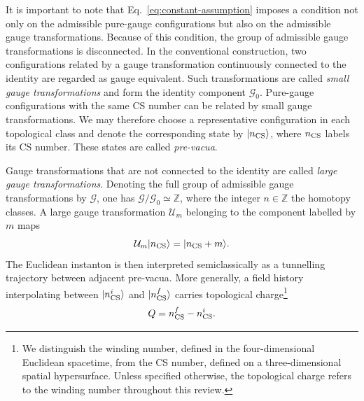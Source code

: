 \documentclass[review]{elsarticle}
\numberwithin{equation}{section}
\numberwithin{table}{section}
\numberwithin{figure}{section}
\begin{document}
It is important to note that Eq.~\eqref{eq:constant-assumption} imposes a condition not only on the admissible pure-gauge configurations but also on the admissible gauge transformations. Because of this condition, the group of admissible gauge transformations is disconnected. In the conventional construction, two configurations related by a gauge transformation continuously connected to the identity are regarded as gauge equivalent. Such transformations are called \emph{small gauge transformations} and form the identity component $\mathcal G_0$. Pure-gauge configurations with the same CS number can be related by small gauge transformations. We may therefore choose a representative configuration in each topological class and denote the corresponding state by $|n_{\rm CS}\rangle$, where $n_{\rm CS}$ labels its CS number. These states are called \emph{pre-vacua}.

Gauge transformations that are not connected to the identity are called \emph{large gauge transformations}. Denoting the full group of admissible gauge transformations by $\mathcal G$, one has $\mathcal G/\mathcal G_0\simeq\mathbb Z$, where the integer $n\in\mathbb Z$ the homotopy classes. A large gauge transformation $\mathcal U_m$ belonging to the component labelled by $m$ maps
\begin{equation}
    \mathcal U_m|n_{\rm CS}\rangle
    =
    |n_{\rm CS}+m\rangle.
\end{equation}
The Euclidean instanton is then interpreted semiclassically as a tunnelling trajectory between adjacent pre-vacua. More generally, a field history interpolating between $|n^i_{\rm CS}\rangle$ and $|n^f_{\rm CS}\rangle$ carries topological charge\footnote{We distinguish the winding number, defined in the four-dimensional Euclidean spacetime, from the CS number, defined on a three-dimensional spatial hypersurface. Unless specified otherwise, the topological charge refers to the winding number throughout this review.}
\begin{equation}
    Q = n^f_{\rm CS}-n_{\rm CS}^i.
\end{equation}
\end{document}

